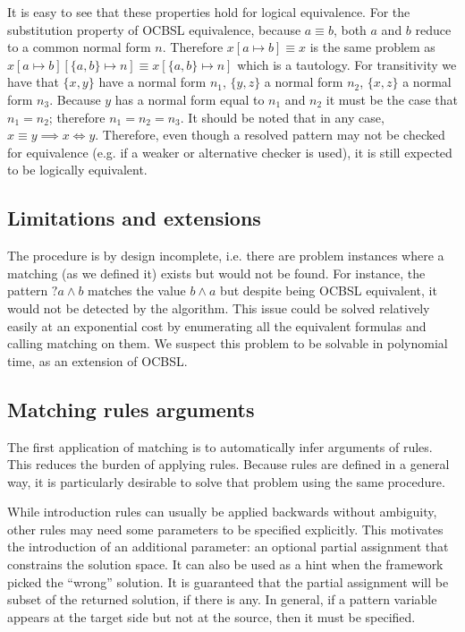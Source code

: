 It is easy to see that these properties hold for logical equivalence. For the substitution property of OCBSL equivalence, because $a \equiv b$, both $a$ and $b$ reduce to a common normal form $n$. Therefore $x[a \mapsto b] \equiv x$ is the same problem as $x[a \mapsto b][\{a, b\} \mapsto n] \equiv x[\{a, b\} \mapsto n]$ which is a tautology. For transitivity we have that $\{x, y\}$ have a normal form $n_1$, $\{y, z\}$ a normal form $n_2$, $\{x, z\}$ a normal form $n_3$. Because $y$ has a normal form equal to $n_1$ and $n_2$ it must be the case that $n_1 = n_2$; therefore $n_1 = n_2 = n_3$.
It should be noted that in any case, $x \equiv y \implies x \Leftrightarrow y$. Therefore, even though a resolved pattern may not be checked for equivalence (e.g. if a weaker or alternative checker is used), it is still expected to be logically equivalent.

\subsection{Limitations and extensions}

The procedure is by design incomplete, i.e. there are problem instances where a matching (as we defined it) exists but would not be found. For instance, the pattern ${?a} \land b$ matches the value $b \land a$ but despite being OCBSL equivalent, it would not be detected by the algorithm. This issue could be solved relatively easily at an exponential cost by enumerating all the equivalent formulas and calling matching on them. We suspect this problem to be solvable in polynomial time, as an extension of OCBSL.

\subsection{Matching rules arguments}

The first application of matching is to automatically infer arguments of rules. This reduces the burden of applying rules. Because rules are defined in a general way, it is particularly desirable to solve that problem using the same procedure.

While introduction rules can usually be applied backwards without ambiguity, other rules may need some parameters to be specified explicitly. This motivates the introduction of an additional parameter: an optional partial assignment that constrains the solution space. It can also be used as a hint when the framework picked the ``wrong'' solution. It is guaranteed that the partial assignment will be subset of the returned solution, if there is any. In general, if a pattern variable appears at the target side but not at the source, then it must be specified.
